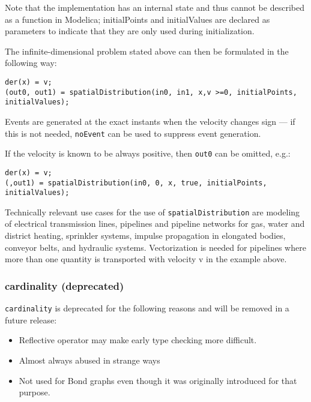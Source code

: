 \begin{nonnormative}
Note that the implementation has an internal state and thus
cannot be described as a function in Modelica; initialPoints and
initialValues are declared as parameters to indicate that they are only
used during initialization.

The infinite-dimensional problem stated above can then be formulated in the following way:
\begin{lstlisting}[language=modelica]
der(x) = v;
(out0, out1) = spatialDistribution(in0, in1, x,v >=0, initialPoints, initialValues);
\end{lstlisting}

Events are generated at the exact instants when the velocity
changes sign --- if this is not needed, \lstinline!noEvent! can be used to
suppress event generation.

If the velocity is known to be always positive, then \lstinline!out0! can be omitted, e.g.:
\begin{lstlisting}[language=modelica]
der(x) = v;
(,out1) = spatialDistribution(in0, 0, x, true, initialPoints, initialValues);
\end{lstlisting}
Technically relevant use cases for the use of
\lstinline!spatialDistribution! are modeling of electrical
transmission lines, pipelines and pipeline networks for gas, water and
district heating, sprinkler systems, impulse propagation in elongated
bodies, conveyor belts, and hydraulic systems. Vectorization is needed
for pipelines where more than one quantity is transported with velocity
v in the example above.
\end{nonnormative}

\subsubsection{cardinality (deprecated)}

\begin{nonnormative}
\lstinline!cardinality! is deprecated for the following reasons and will be removed in a future release:
\begin{itemize}
\item
  Reflective operator may make early type checking more difficult.
\item
  Almost always abused in strange ways
\item
  Not used for Bond graphs even though it was originally introduced for that purpose.
\end{itemize}
\end{nonnormative}

